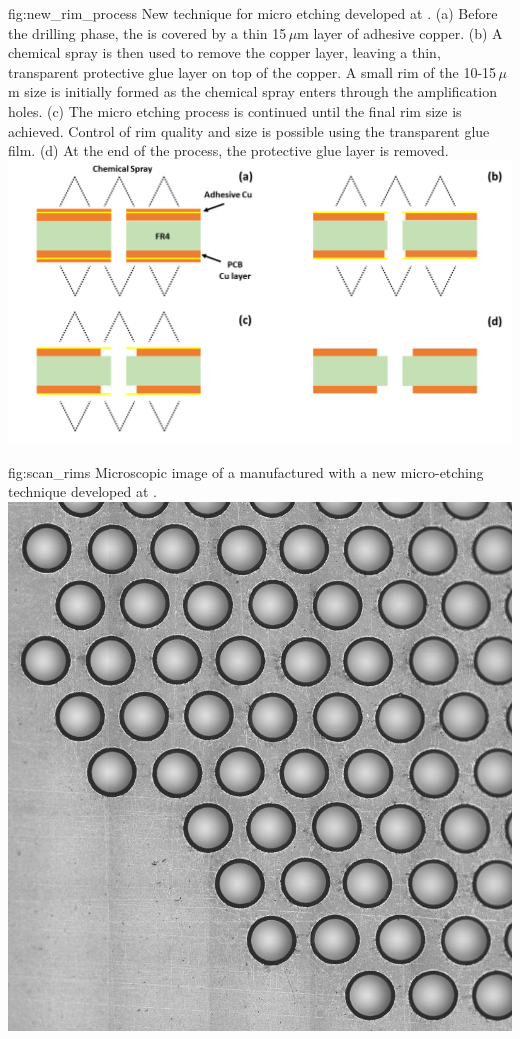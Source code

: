 \begin{dunefigure}
{fig:new_rim_process}
{New technique for  micro etching developed at . (a) Before the drilling phase, the  is covered by a thin  15\,$\mu$m layer of adhesive copper. (b) A chemical spray is then used to remove the copper layer, leaving a thin, transparent protective glue layer on top of the  copper. A small rim of the 10-15\,$\mu$m size is initially formed as the chemical spray enters through the amplification holes. (c) The micro etching process is continued until the final rim size is achieved. Control of rim quality and size is possible using the transparent glue film. (d) At the end of the process, the protective glue layer is removed.}
\includegraphics[width=1.0\textwidth]{graphics/NewRims.png}
\end{dunefigure}
\begin{dunefigure}
{fig:scan_rims}
{Microscopic image of a  manufactured with a new micro-etching technique developed at }.
\includegraphics[width=0.5
\textwidth]{graphics/Scan_8.jpg}
\end{dunefigure}

